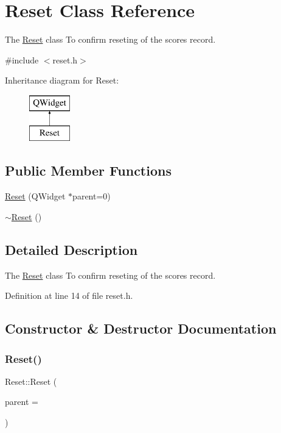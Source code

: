 \hypertarget{class_reset}{}\section{Reset Class Reference}
\label{class_reset}


The \hyperlink{class_reset}{Reset} class To confirm reseting of the scores record.  




{\ttfamily \#include $<$reset.\+h$>$}

Inheritance diagram for Reset\+:\begin{figure}[H]
\begin{center}
\leavevmode
\includegraphics[height=2.000000cm]{class_reset}
\end{center}
\end{figure}
\subsection*{Public Member Functions}
\begin{DoxyCompactItemize}
\item 
\hyperlink{class_reset_a1a9ff0a65a0f9fa43e72174921973c12}{Reset} (Q\+Widget $\ast$parent=0)
\item 
\hyperlink{class_reset_a1d5b1c4b9325560ff386c64e3e6de0f0}{$\sim$\+Reset} ()
\end{DoxyCompactItemize}


\subsection{Detailed Description}
The \hyperlink{class_reset}{Reset} class To confirm reseting of the scores record. 

Definition at line 14 of file reset.\+h.



\subsection{Constructor \& Destructor Documentation}
\hypertarget{class_reset_a1a9ff0a65a0f9fa43e72174921973c12}{}\label{class_reset_a1a9ff0a65a0f9fa43e72174921973c12} 
\subsubsection{\texorpdfstring{Reset()}{Reset()}}
{\footnotesize\ttfamily Reset\+::\+Reset (\begin{DoxyParamCaption}\item[{Q\+Widget $\ast$}]{parent = {} }\end{DoxyParamCaption})\hspace{0.3cm}{\ttfamily [explicit]}}



